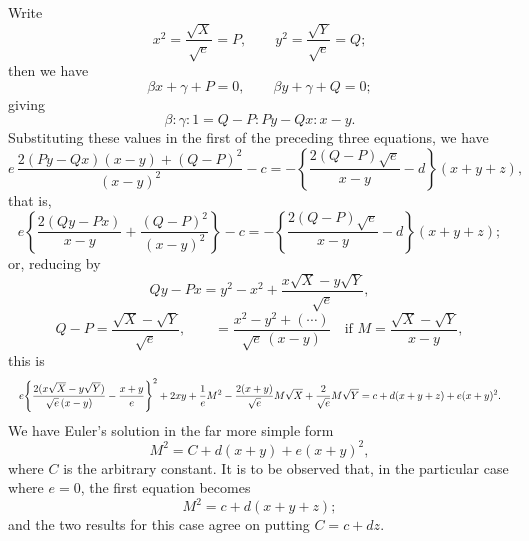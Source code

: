 \documentclass[11pt]{article}
\begin{document}
Write
\[
x^2 = \dfrac{\sqrt{X}}{\sqrt{e}} = P,\qquad y^2 = \dfrac{\sqrt{Y}}{\sqrt{e}} = Q;
\]
then we have
\[
\beta x + \gamma + P = 0,\qquad \beta y + \gamma + Q = 0;
\]
giving
\[
\beta : \gamma : 1 = Q - P : Py - Qx : x - y.
\]
Substituting these values in the first of the preceding three equations, we have
\[
e\,\dfrac{2(Py - Qx)(x - y) + (Q - P)^2}{(x - y)^2} - c = -\!\left\{\dfrac{2(Q - P)\sqrt{e}}{x - y} - d\right\}\!(x + y + z),
\]
that is,
\[
e\left\{\dfrac{2(Qy - Px)}{x - y} + \dfrac{(Q - P)^2}{(x - y)^2}\right\} - c = -\!\left\{\dfrac{2(Q - P)\sqrt{e}}{x - y} - d\right\}\!(x + y + z);
\]
or, reducing by
\[
Qy - Px = y^2 - x^2 + \dfrac{x\sqrt{X} - y\sqrt{Y}}{\sqrt{e}},
\]
\[
Q - P = \dfrac{\sqrt{X} - \sqrt{Y}}{\sqrt{e}},\qquad =\dfrac{x^2 - y^2 + (\cdots)}{\sqrt{e}\,(x - y)}\quad\text{if } M = \dfrac{\sqrt{X} - \sqrt{Y}}{x - y},
\]
this is
\[
\resizebox{\textwidth}{!}{$\displaystyle e\!\left\{\dfrac{2(x\sqrt{X} - y\sqrt{Y})}{\sqrt{e}\,(x - y)} - \dfrac{x + y}{e}\right\}^{2} + 2xy + \dfrac{1}{e}M^2 - \dfrac{2(x + y)}{\sqrt{e}}M\sqrt{X} + \dfrac{2}{\sqrt{e}}M\sqrt{Y} = c + d(x + y + z) + e(x + y)^2.$}
\]
We have Euler's solution in the far more simple form
\[
M^2 = C + d(x + y) + e(x + y)^2,
\]
where $C$ is the arbitrary constant. It is to be observed that, in the particular case where $e = 0$, the first equation becomes
\[
M^2 = c + d(x + y + z);
\]
and the two results for this case agree on putting $C = c + dz$.
\end{document}
